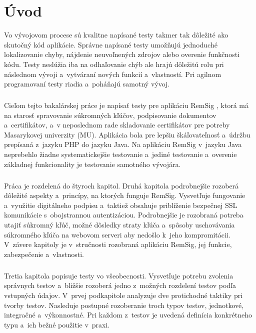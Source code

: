 \documentclass[
  digital, %
  table,   %
oneside,
  nolof,     %
  nolot,     %
]{fithesis3}
\begin{document}
\chapter{Úvod}
Vo vývojovom procese sú kvalitne napísané testy takmer tak dôležité ako skutočný kód aplikácie. Správne napísané testy umožňujú jednoduché lokalizovanie chyby, nájdenie neuvoľnených zdrojov alebo overenie funkčnosti kódu. Testy neslúžia iba na odhaľovanie chýb ale hrajú dôležitú rolu pri následnom vývoji a~vytváraní nových funkcií a~vlastností. Pri agilnom programovaní \cite{agileDef} testy riadia a~poháňajú samotný vývoj. \paragraph{}
Cieľom tejto bakalárskej práce je napísať testy pre aplikáciu RemSig \cite{remsigMuni}, ktorá má na starosť spravovanie súkromných kľúčov, podpisovanie dokumentov a~certifikátov, a~v neposlednom rade skladovanie certifikátov pre potreby Masarykovej univerzity (MU). Aplikácia bola pre lepšiu škáľovateľnosť a~údržbu prepísaná z~jazyku PHP do jazyku Java. Na aplikáciu RemSig  v~jazyku Java neprebehlo žiadne systematickejšie testovanie a~jediné testovanie a~overenie základnej funkcionality je testovanie samotného vývojára.\paragraph{}
Práca je rozdelená do štyroch kapitol. Druhá kapitola podrobnejšie rozoberá dôležité aspekty a~princípy, na ktorých funguje RemSig. Vysvetľuje fungovanie a~využitie digitálneho podpisu a~taktiež obsahuje priblíženie bezpečnej SSL komunikácie s~obojstrannou autentizáciou. Podrobnejšie je rozobraná potreba utajiť súkromný kľúč, možné dôsledky straty kľúča a~spôsoby uschovávania súkromného kľúča na webovom serveri aby nedošlo k~jeho kompromitácii. V~závere kapitoly  je v~stručnosti rozobraná aplikáciu RemSig, jej funkcie, zabezpečenie a~vlastnosti. \paragraph{}
Tretia kapitola popisuje testy vo všeobecnosti. Vysvetľuje potrebu zvolenia správnych testov a~bližšie rozoberá jedno z~možných rozdelení testov podľa vstupných údajov. V~prvej podkapitole analyzuje dve protichodné taktiky pri tvorby testov. Nasleduje postupné rozoberanie troch typov testov, jednotkové, integračné a~výkonnostné. Pri každom z~testov je uvedená definícia konkrétneho typu a~ich bežné použitie v~praxi.\paragraph{}
\end{document}
